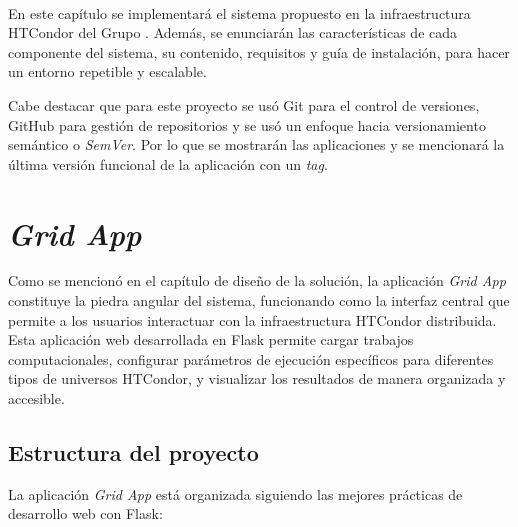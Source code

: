 \label{cap:pmv}
\mbox{}\\
En este capítulo se implementará el sistema propuesto en la infraestructura HTCondor del Grupo \GRID. Además, se enunciarán las características de cada componente del sistema, su contenido, requisitos y guía de instalación, para hacer un entorno repetible y escalable.

Cabe destacar que para este proyecto se usó Git para el control de versiones, GitHub para gestión de repositorios y se usó un enfoque hacia versionamiento semántico o \textit{SemVer}. Por lo que se mostrarán las aplicaciones y se mencionará la última versión funcional de la aplicación con un \textit{tag}.

\section{\textit{Grid App}}
\noindent
Como se mencionó en el capítulo de diseño de la solución, la aplicación \textit{Grid App} constituye la piedra angular del sistema, funcionando como la interfaz central que permite a los usuarios interactuar con la infraestructura HTCondor distribuida. Esta aplicación web desarrollada en Flask permite cargar trabajos computacionales, configurar parámetros de ejecución específicos para diferentes tipos de universos HTCondor, y visualizar los resultados de manera organizada y accesible.

\subsection{Estructura del proyecto}
\noindent
La aplicación \textit{Grid App} está organizada siguiendo las mejores prácticas de desarrollo web con Flask:

